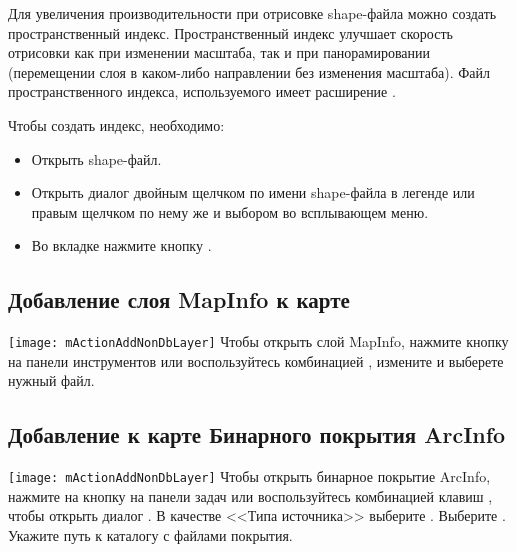 Для увеличения производительности при отрисовке shape-файла можно создать пространственный индекс.
Пространственный индекс  улучшает
скорость отрисовки как при изменении масштаба, так и при панорамировании (перемещении слоя в каком-либо направлении без изменения масштаба).
Файл пространственного индекса, используемого \qg имеет расширение .

Чтобы создать индекс, необходимо:

\begin{itemize}[label=--]
\item Открыть shape-файл.
\item Открыть диалог  двойным щелчком
по имени shape-файла в легенде или правым щелчком по нему же и выбором
 во всплывающем меню.
\item Во вкладке  нажмите кнопку .
\end{itemize}

\subsection{Добавление слоя MapInfo к карте}

\texttt{[image: mActionAddNonDbLayer]} Чтобы открыть слой MapInfo, нажмите кнопку  на панели инструментов или воспользуйтесь комбинацией , измените
и выберете нужный файл.

\subsection{Добавление к карте Бинарного покрытия ArcInfo}

\texttt{[image: mActionAddNonDbLayer]} Чтобы открыть бинарное покрытие ArcInfo, нажмите на кнопку
 на панели задач или воспользуйтесь комбинацией клавиш
, чтобы открыть диалог . В качестве <<Типа источника>> выберите
. Выберите .
Укажите путь к каталогу с файлами покрытия.

